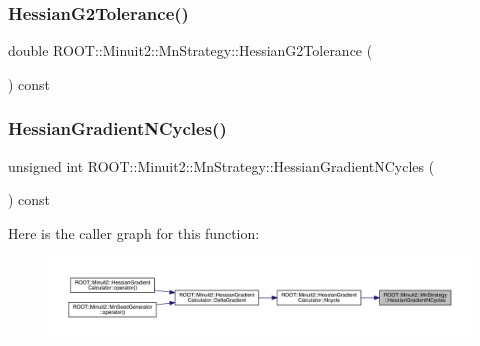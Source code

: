 \subsubsection{\texorpdfstring{HessianG2Tolerance()}{HessianG2Tolerance()}\hspace{0.1cm}{\footnotesize\ttfamily [3/3]}}
{\footnotesize\ttfamily double R\+O\+O\+T\+::\+Minuit2\+::\+Mn\+Strategy\+::\+Hessian\+G2\+Tolerance (\begin{DoxyParamCaption}{ }\end{DoxyParamCaption}) const\hspace{0.3cm}{\ttfamily [inline]}}

\mbox{\label{classROOT_1_1Minuit2_1_1MnStrategy_a49354e374820b73f7e8b6701d7e07922}} 
\subsubsection{\texorpdfstring{HessianGradientNCycles()}{HessianGradientNCycles()}\hspace{0.1cm}{\footnotesize\ttfamily [1/3]}}
{\footnotesize\ttfamily unsigned int R\+O\+O\+T\+::\+Minuit2\+::\+Mn\+Strategy\+::\+Hessian\+Gradient\+N\+Cycles (\begin{DoxyParamCaption}{ }\end{DoxyParamCaption}) const\hspace{0.3cm}{\ttfamily [inline]}}

Here is the caller graph for this function\+:
\nopagebreak
\begin{figure}[H]
\begin{center}
\leavevmode
\includegraphics[width=350pt]{da/de4/classROOT_1_1Minuit2_1_1MnStrategy_a49354e374820b73f7e8b6701d7e07922_icgraph}
\end{center}
\end{figure}
\mbox{\label{classROOT_1_1Minuit2_1_1MnStrategy_a49354e374820b73f7e8b6701d7e07922}} 
